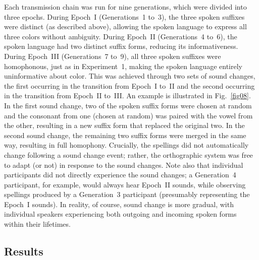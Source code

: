 \documentclass[doc,biblatex]{apa7}
\begin{document}
Each transmission chain was run for nine generations, which were divided into three epochs. During Epoch~I (Generations~1 to~3), the three spoken suffixes were distinct (as described above), allowing the spoken language to express all three colors without ambiguity. During Epoch~II (Generations~4 to~6), the spoken language had two distinct suffix forms, reducing its informativeness. During Epoch~III (Generations~7 to~9), all three spoken suffixes were homophonous, just as in Experiment~1, making the spoken language entirely uninformative about color. This was achieved through two sets of sound changes, the first occurring in the transition from Epoch~I to~II and the second occurring in the transition from Epoch~II to~III. An example is illustrated in Fig.~\ref{fig08}. In the first sound change, two of the spoken suffix forms were chosen at random and the consonant from one (chosen at random) was paired with the vowel from the other, resulting in a new suffix form that replaced the original two. In the second sound change, the remaining two suffix forms were merged in the same way, resulting in full homophony. Crucially, the spellings did not automatically change following a sound change event; rather, the orthographic system was free to adapt (or not) in response to the sound changes. Note also that individual participants did not directly experience the sound changes; a Generation~4 participant, for example, would always hear Epoch~II sounds, while observing spellings produced by a Generation~3 participant (presumably representing the Epoch~I sounds). In reality, of course, sound change is more gradual, with individual speakers experiencing both outgoing and incoming spoken forms within their lifetimes.

\subsection{Results}
\end{document}
